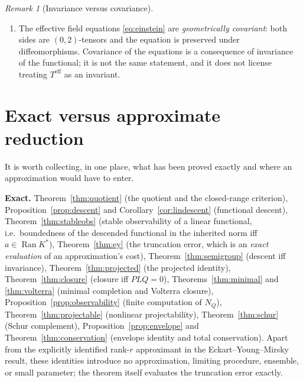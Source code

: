 \documentclass[11pt,reqno]{amsart}
\numberwithin{equation}{section}
\theoremstyle{plain}
\theoremstyle{definition}
\theoremstyle{remark}
\newtheorem{remark}[theorem]{Remark}
\newcommand{\Ran}{\operatorname{Ran}}
\begin{document}
\begin{remark}[Invariance versus covariance]
\begin{enumerate}
\begin{itemize}
\item \emph{Genuine diffeomorphism-invariant observables.} These require a further step:
invariant integration (e.g.\ $\int_{M}T^{\mathrm{eff}}\sqrt{-g}\,d^{4}x$ over an invariantly
specified region, or an integral against an invariantly constructed density), smearing against
equivariantly chosen test tensors, or relational evaluation---evaluating one field at a point
located by the values of other fields, so that the point is specified by the configuration
rather than by a coordinate.
\end{itemize}
The equivariant response is the primary object; covariant scalar fields are contractions of it;
invariant observables are constructed from those by one of the three routes just named.
\item The effective field equations \eqref{eq:einstein} are \emph{geometrically covariant}:
both sides are $(0,2)$-tensors and the equation is preserved under diffeomorphisms. Covariance
of the equations is a consequence of invariance of the functional; it is not the same
statement, and it does not license treating $T^{\mathrm{eff}}$ as an invariant.
\end{enumerate}
\end{remark}

\section{Exact versus approximate reduction}
\label{sec:discussion}

It is worth collecting, in one place, what has been proved exactly and where an approximation
would have to enter.

\smallskip
\noindent\textbf{Exact.} Theorem~\ref{thm:quotient} (the quotient and the closed-range
criterion), Proposition~\ref{prop:descent} and Corollary~\ref{cor:lindescent} (functional
descent), Theorem~\ref{thm:stableobs} (stable observability of a linear functional, i.e.\
boundedness of the descended functional in the inherited norm iff $a\in\Ran K^{*}$),
Theorem~\ref{thm:ey} (the truncation error, which is an \emph{exact evaluation} of an
approximation's cost), Theorem~\ref{thm:semigroup} (descent iff invariance),
Theorem~\ref{thm:projected} (the projected identity), Theorem~\ref{thm:closure} (closure iff
$PLQ=0$), Theorems~\ref{thm:minimal} and \ref{thm:volterra} (minimal completion and Volterra
closure), Proposition~\ref{prop:observability} (finite computation of $N_{Q}$),
Theorem~\ref{thm:projectable} (nonlinear projectability), Theorem~\ref{thm:schur} (Schur
complement), Proposition~\ref{prop:envelope} and Theorem~\ref{thm:conservation} (envelope
identity and total conservation). Apart from the explicitly identified rank-$r$ approximant in
the Eckart--Young--Mirsky result, these identities introduce no approximation, limiting
procedure, ensemble, or small parameter; the theorem itself evaluates the truncation error
exactly.
\end{document}

